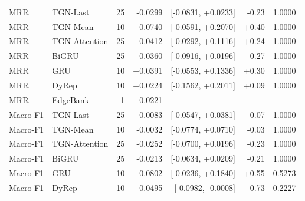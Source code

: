 \begin{tabular}{llrrrrr}
\midrule
MRR & TGN-Last & 25 & -0.0299 & [-0.0831, +0.0233] & -0.23 & 1.0000 \\
MRR & TGN-Mean & 10 & +0.0740 & [-0.0591, +0.2070] & +0.40 & 1.0000 \\
MRR & TGN-Attention & 25 & +0.0412 & [-0.0292, +0.1116] & +0.24 & 1.0000 \\
MRR & BiGRU & 25 & -0.0360 & [-0.0916, +0.0196] & -0.27 & 1.0000 \\
MRR & GRU & 10 & +0.0391 & [-0.0553, +0.1336] & +0.30 & 1.0000 \\
MRR & DyRep & 10 & +0.0224 & [-0.1562, +0.2011] & +0.09 & 1.0000 \\
MRR & EdgeBank & 1 & -0.0221 & -- & -- & -- \\
\midrule
Macro-F1 & TGN-Last & 25 & -0.0083 & [-0.0547, +0.0381] & -0.07 & 1.0000 \\
Macro-F1 & TGN-Mean & 10 & -0.0032 & [-0.0774, +0.0710] & -0.03 & 1.0000 \\
Macro-F1 & TGN-Attention & 25 & -0.0252 & [-0.0700, +0.0196] & -0.23 & 1.0000 \\
Macro-F1 & BiGRU & 25 & -0.0213 & [-0.0634, +0.0209] & -0.21 & 1.0000 \\
Macro-F1 & GRU & 10 & +0.0802 & [-0.0236, +0.1840] & +0.55 & 0.5273 \\
Macro-F1 & DyRep & 10 & -0.0495 & [-0.0982, -0.0008] & -0.73 & 0.2227 \\
\midrule
\bottomrule
\end{tabular}
